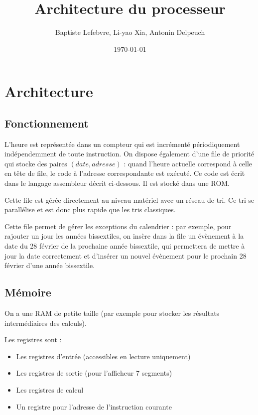 \documentclass[a4paper]{article}
\begin{document}
\title{Architecture du processeur}
\author{Baptiste Lefebvre, Li-yao Xia, Antonin Delpeuch}
\date{\today}

\maketitle

\section{Architecture}

\subsection{Fonctionnement}

L'heure est représentée dans un compteur qui est incrémenté
périodiquement indépendemment de toute instruction.
On dispose également d'une file de priorité qui stocke des paires $(date,
adresse)$ : quand l'heure actuelle correspond à celle en tête de file, le
code à l'adresse correspondante est exécuté. Ce code est écrit dans le
langage assembleur décrit ci-dessous. Il est stocké dans une ROM.

Cette file est gérée directement au niveau matériel avec un r\'{e}seau de
tri. Ce tri se parallélise et est donc plus rapide que les tris classiques.

Cette file permet de gérer les exceptions du calendrier : par exemple,
pour rajouter un jour les années bissextiles, on insère dans la file un
évènement à la date du 28 février de la prochaine année bissextile,
qui permettera de mettre à jour la date correctement et d'insérer un nouvel évènement pour
le prochain 28 février d'une année bissextile.

\subsection{Mémoire}

On a une RAM de petite taille (par exemple pour stocker les résultats
intermédiaires des calculs).

Les registres sont :
\begin{itemize}
\item Les registres d'entrée (accessibles en lecture uniquement)
\item Les registres de sortie (pour l'afficheur 7 segments)
\item Les registres de calcul
\item Un registre pour l'adresse de l'instruction courante
\end{itemize}
\end{document}

